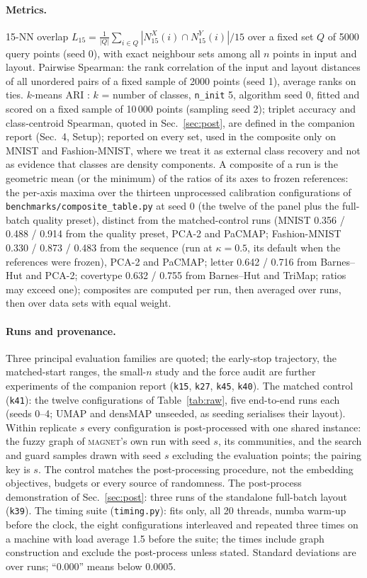 \documentclass[10pt,twocolumn]{article}
\newcommand{\magnet}{\textsc{magnet}}
\newcommand{\knn}{15-NN}
\begin{document}
\paragraph{Metrics.} \knn{} overlap $L_{15} = \frac{1}{|Q|} \sum_{i \in Q} |N^X_{15}(i) \cap N^Y_{15}(i)| / 15$
over a fixed set $Q$ of 5000 query points (seed 0), with exact neighbour sets among all $n$ points in input and
layout. Pairwise Spearman: the rank correlation of the input and layout distances of all unordered pairs of a
fixed sample of 2000 points (seed 1), average ranks on ties. $k$-means ARI \citep{hubert1985ari}: $k$ = number
of classes, \texttt{n\_init} 5, algorithm seed 0, fitted and scored on a fixed sample of 10\,000 points (sampling
seed 2); triplet accuracy and class-centroid Spearman, quoted in Sec.~\ref{sec:post}, are defined in the companion
report (Sec.~4, Setup);
reported on every set, used in the composite only on MNIST and Fashion-MNIST, where we treat it as external class
recovery and not as evidence that classes are density components. A composite of a run is the geometric mean (or
the minimum) of the ratios of its axes to frozen references: the per-axis maxima over the thirteen unprocessed
calibration configurations of \texttt{benchmarks/composite\_table.py} at seed 0 (the twelve of the panel plus the
full-batch quality preset), distinct from the matched-control runs (MNIST 0.356 / 0.488 / 0.914 from the quality
preset, PCA-2 and PaCMAP; Fashion-MNIST 0.330 / 0.873 / 0.483 from the sequence (run at $\kappa = 0.5$, its default when the references were frozen), PCA-2 and PaCMAP; letter 0.642 /
0.716 from Barnes--Hut and PCA-2; covertype 0.632 / 0.755 from Barnes--Hut and TriMap; ratios may exceed one); composites are
computed per run, then averaged over runs, then over data sets with equal weight.

\paragraph{Runs and provenance.} Three principal evaluation families are quoted; the early-stop trajectory,
the matched-start ranges, the small-$n$ study and the force audit are further experiments of the companion report
(\texttt{k15}, \texttt{k27}, \texttt{k45}, \texttt{k40}). The matched control (\texttt{k41}): the twelve
configurations of Table~\ref{tab:raw}, five end-to-end runs each (seeds 0--4; UMAP and densMAP unseeded, as
seeding serialises their layout). Within replicate $s$ every configuration is post-processed with one shared
instance: the fuzzy graph of \magnet{}'s own run with seed $s$, its communities, and the search and guard samples
drawn with seed $s$ excluding the evaluation points; the pairing key is $s$. The control matches the
post-processing procedure, not the embedding objectives, budgets or every source of randomness. The
post-process demonstration of Sec.~\ref{sec:post}: three runs of the standalone full-batch layout (\texttt{k39}).
The timing suite (\texttt{timing.py}): fits only, all 20 threads, numba warm-up before the clock, the eight
configurations interleaved and repeated three times on a machine with load average 1.5 before the suite; the
times include graph construction and exclude the post-process unless stated. Standard deviations are over runs; ``0.000'' means below 0.0005.
\end{document}
